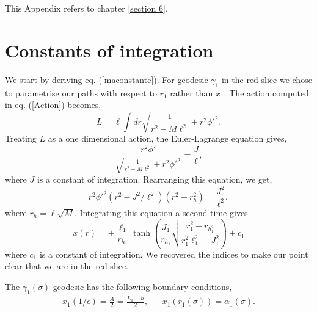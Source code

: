 This Appendix refers to chapter \ref{section 6}.

\section{Constants of integration}

We start by deriving eq. (\ref{maconstante}). For geodesic $\gamma_1$ in the red slice we chose to parametrise our paths with respect to $r_1$ rather than $x_1$. The action computed in eq. (\ref{Action}) becomes,
\begin{equation}\label{Aaction}
    L = \ell\int d r\sqrt{\frac{1}{r^2-M\ell^2}+r^2\phi'^2}.
\end{equation}
Treating $L$ as a one dimensional action, the Euler-Lagrange equation gives,
\begin{equation}
    \frac{r^2\phi'}{\sqrt{\frac{1}{r^2-M\ell^2}+r^2\phi'^2}}= \frac{J}{\ell},
\end{equation}
where $J$ is a constant of integration. Rearranging this equation, we get,
\begin{equation}
    r^2\phi'^2(r^2-J^2/\ell^2)(r^2-r_h^2)=\frac{J^2}{\ell^2},
\end{equation}
where $r_h=\ell\sqrt{M}$. Integrating this equation a second time gives
\begin{equation}\label{therealsol}
    x(r) = \pm\frac{\ell_1}{r_h_1}\tanh\left(\frac{J_1}{r_h_1}\sqrt{\frac{r_1^2-r_h_1^2}{r_1^2\ell_1^2-J_1^2}}\right) + c_1
\end{equation}
where $c_1$ is a constant of integration. We recovered the indices to make our point clear that we are in the red slice.

The $\gamma_1(\sigma)$ geodesic has the following boundary conditions,
\begin{align}
    x_1(1/\epsilon) = \frac{A}{2} = \frac{L_1-h}{2}, && x_1(r_1(\sigma)) = \alpha_1(\sigma).
\end{align}

